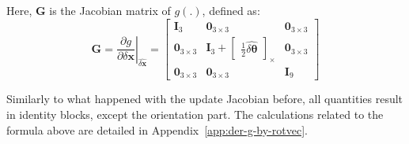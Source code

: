 Here, $\mathbf{G}$ is the Jacobian matrix of $g(.)$, defined as:
\begin{equation}
    \mathbf{G}=\left.\frac{\partial g}{\partial\delta\mathbf{x}}\right\vert_{\hat{\delta\mathbf{x}}}=\begin{bmatrix}
        \mathbf{I}_3 & \mathbf{0}_{3\times 3} & \mathbf{0}_{3\times 3} \\
        \mathbf{0}_{3\times 3} & \mathbf{I}_3+\begin{bmatrix}
            \frac{1}{2}\hat{\delta\boldsymbol{\theta}}
        \end{bmatrix}_\times & \mathbf{0}_{3\times 3} \\
        \mathbf{0}_{3\times 3} & \mathbf{0}_{3\times 3} & \mathbf{I}_9
    \end{bmatrix}
\end{equation}

Similarly to what happened with the update Jacobian before, all quantities result in identity blocks, except the orientation part. The calculations related to the formula above are detailed in Appendix~\ref{app:der-g-by-rotvec}.